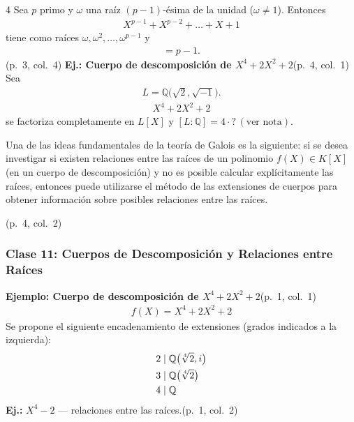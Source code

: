\documentclass[landscape,a4paper]{article}
\begin{document}
\begin{multicols}{4}
Sea $p$ primo y $\omega$ una raíz $(p\!-\!1)$‑ésima de la unidad ($\omega\neq1$). Entonces
\begin{align*}
X^{p-1}+X^{p-2}+\dots+X+1
\end{align*}
tiene como raíces $\omega,\omega^{2},\dots,\omega^{p-1}$ y
\begin{align*}
[\mathbb{Q}(\omega):\mathbb{Q}]=p-1.
\end{align*}
(p.~3, col.~4)
\noindent\textbf{Ej.: Cuerpo de descomposición de $X^{4}+2X^{2}+2$}\hfill(p.~4, col.~1)\\
Sea
\begin{align*}
L=\mathbb{Q}\bigl(\sqrt{2},\sqrt{-1}\bigr).
\end{align*}
\begin{align*}
X^{4}+2X^{2}+2
\end{align*}
se factoriza completamente en $L[X]$ y $[L:\mathbb{Q}]=4\cdot?\,(\text{ver nota}).$
\begin{tcolorbox}[title={Una idea fundamental de la teoría de Galois},colback=white,colframe=blue!80!black,colbacktitle=blue!80!black,coltitle=white]
Una de las ideas fundamentales de la teoría de Galois es la siguiente:  
si se desea investigar si existen relaciones entre las raíces de un polinomio $f(X)\in K[X]$ (en un cuerpo de descomposición) y no es posible calcular explícitamente las raíces, entonces puede utilizarse el método de las extensiones de cuerpos para obtener información sobre posibles relaciones entre las raíces.
\end{tcolorbox}\hfill(p.~4, col.~2)
\subsubsection*{Clase 11: Cuerpos de Descomposición y Relaciones entre Raíces}
\noindent\textbf{Ejemplo: Cuerpo de descomposición de $X^{4}+2X^{2}+2$}\hfill(p.~1, col.~1)\\[-0.5em]
\begin{align*}
\textstyle f(X)=X^{4}+2X^{2}+2
\end{align*}
Se propone el siguiente encadenamiento de extensiones (grados indicados a la izquierda):
\begin{align*}
&2\;|\;\mathbb{Q}\bigl(\root 4 \of 2,i\bigr)\\
&3\;|\;\mathbb{Q}\bigl(\root 4 \of 2\bigr)\\
&4\;|\;\mathbb{Q}
\end{align*}
\noindent\textbf{Ej.:} $X^{4}-2$ — relaciones entre las raíces.\hfill(p.~1, col.~2)


\end{multicols}
\end{document}
